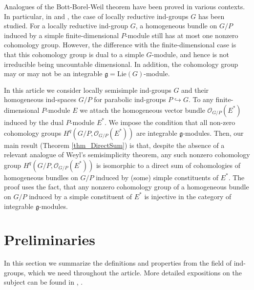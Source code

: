 \documentclass[12pt]{article}
\newcommand{\Lie} {\mathrm{Lie}}
\def \OO {{\mathcal O}}
\def \g {\mathfrak{g}}
\begin{document}
Analogues of the Bott-Borel-Weil theorem have been proved in various contexts. In particular, in \cite{DPW} and \cite{DP}, the case of locally reductive ind-groups $G$ has been studied. For a locally reductive ind-group $G$, a homogeneous bundle on $G/P$ induced by a simple finite-dimensional $P$-module still has at most one nonzero cohomology group. However, the difference with the finite-dimensional case is that this cohomology group is dual to a simple $G$-module, and hence is not irreducible being uncountable dimensional. In addition, the cohomology group may or may not be an integrable $\g = \Lie(G)$-module.

In this article we consider locally semisimple ind-groups $G$ and their homogeneous ind-spaces $G/P$ for parabolic ind-groups $P \hookrightarrow G$. To any finite-dimensional $P$-module $E$ we attach the homogeneous vector bundle $\OO_{G/P}(E^*)$ induced by the dual $P$-module $E^*$. We impose the condition that all non-zero cohomology groups $H^q(G/P,\OO_{G/P}(E^*))$ %
are integrable $\g$-modules.
Then, our main result (Theorem \ref{thm_DirectSum}) is that, despite the absence of a relevant analogue of Weyl's semisimplicity theorem, any such nonzero cohomology group $H^q(G/P,\OO_{G/P}(E^*))$ %
is isomorphic to a direct sum of cohomologies of homogeneous bundles on $G/P$ induced by (some) simple constituents of $E^*$. The proof uses the fact, that any nonzero cohomology group of a homogeneous bundle on $G/P$ induced by a simple constituent of $E^*$ 
is injective in the category of integrable $\g$-modules.

\section{Preliminaries} \label{sec_Prelim}
In this section we summarize the definitions and properties from the field of ind-groups, which we need throughout the article. More detailed expositions on the subject can be found in \cite{DPW}, \cite{DP}.
\end{document}
